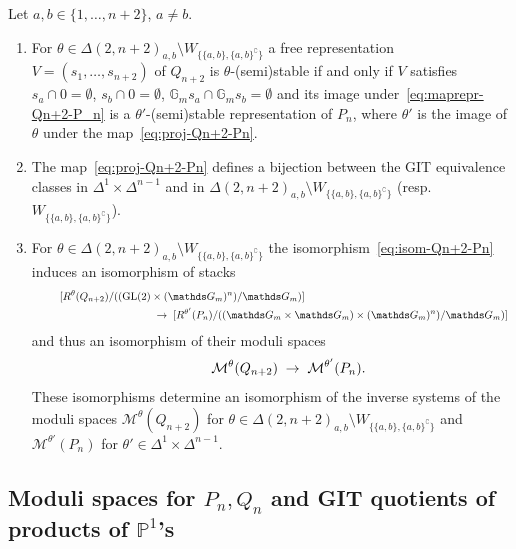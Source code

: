 \documentclass[ALCO,ThmDefs,Unicode,epreuves]{cedram}
\def\G{\mathds G}
\def\P{\mathds P}
\DeclareMathOperator{\GL}{GL}
\begin{document}
\begin{coro}\label{cor:Qn+2-P_n}
Let $a,b\in\{1,\ldots,n+2\}$, $a\neq b$.%

\begin{enumerate}[label=(\alph*)]
\item\label{coro2.7_a}
For $\theta\in\Delta(2,n+2)_{a,b}\setminus W_{\{\{a,b\},\{a,b\}^\complement\}}$
a free representation $V=(s_1,\ldots,s_{n+2})$ of $Q_{n+2}$ is $\theta$-(semi)stable 
if and only if $V$ satisfies $s_a\cap 0=\emptyset$, $s_b\cap 0=\emptyset$, 
$\G_m s_a\cap\G_ms_b=\emptyset$ and its image under~\eqref{eq:maprepr-Qn+2-P_n} 
is a $\theta'$-(semi)stable representation of $P_n$, where $\theta'$ is the image of 
$\theta$ under the map~\eqref{eq:proj-Qn+2-Pn}. %

\item\label{coro2.7_b}
The map~\eqref{eq:proj-Qn+2-Pn} defines a bijection between
the GIT equivalence classes in $\Delta^1\times\Delta^{n-1}$ and in
$\Delta(2,n+2)_{a,b}\setminus W_{\{\{a,b\},\{a,b\}^\complement\}}$ 
(resp.\ $ W_{\{\{a,b\},\{a,b\}^\complement\}}$). %

\item\label{coro2.7_c}
For $\theta\in\Delta(2,n+2)_{a,b}\setminus W_{\{\{a,b\},\{a,b\}^\complement\}}$
the isomorphism~\eqref{eq:isom-Qn+2-Pn} induces an isomorphism of stacks
\[
\hspace*{\leftmargini}\begin{aligned}
[R^\theta(Q_{n+2})/((\GL(2)&\times(\G_m)^n)/\G_m)]\\
&\;\to\;
[R^{\theta'}(P_n)/((\G_m\times\G_m)\times(\G_m)^n)/\G_m)]\hspace*{\leftmargini}
\end{aligned}
 \]
and thus an isomorphism of their moduli spaces
\[
\hspace*{\leftmargini}
\mathcal M^\theta(Q_{n+2})\;\to\;\mathcal M^{\theta'}(P_n).
\]
These isomorphisms determine an isomorphism of the inverse systems of the moduli spaces 
$\mathcal M^\theta(Q_{n+2})$ for $\theta\in\Delta(2,n+2)_{a,b}\setminus 
W_{\{\{a,b\},\{a,b\}^\complement\}}$ and $\mathcal M^{\theta'}(P_n)$ 
for $\theta'\in\Delta^1\times\Delta^{n-1}$. 
\end{enumerate}
\end{coro}




\subsection{Moduli spaces for \texorpdfstring{$P_n,Q_n$}{Pn,Qn} and GIT quotients of products of \texorpdfstring{$\P^1$}{P1}'s}
\label{subsec:quivermoduli-GITP1}
\end{document}
